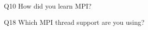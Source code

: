 \begin{description}%
\item{Q10} How did you learn MPI?%
\item{Q18} Which MPI thread support are you using?%
\end{description}%
